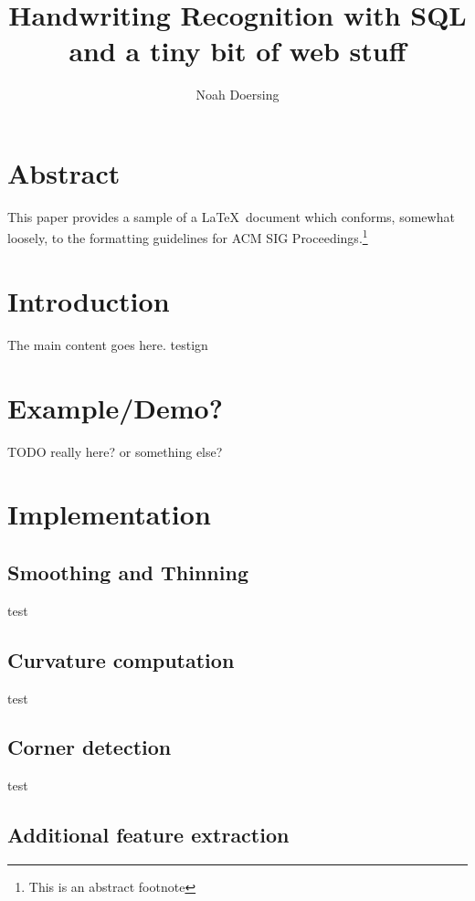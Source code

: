 \documentclass[sigconf]{acmart}
\begin{document}
\title{Handwriting Recognition with SQL\\\hspace{6.88cm}\footnotesize and a tiny bit of web stuff}
\author{Noah Doersing}
\affiliation{}

\maketitle

\section*{Abstract}
This paper provides a sample of a \LaTeX\ document which conforms, somewhat loosely, to the formatting guidelines for ACM SIG Proceedings.\footnote{This is an abstract footnote}

\section{Introduction}

The main content goes here. testign

\section{Example/Demo?}

TODO really here? or something else?

\section{Implementation}

\subsection{Smoothing and Thinning}

test

\subsection{Curvature computation}

test

\subsection{Corner detection}

test

\subsection{Additional feature extraction}
\end{document}
